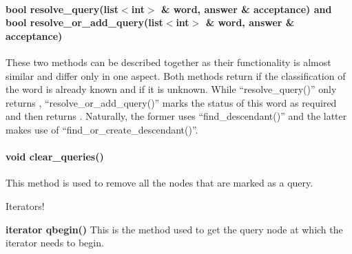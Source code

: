 \paragraph{bool resolve\_query(list$<$int$>$ \& word, answer \& acceptance) and bool resolve\_or\_add\_query(list$<$int$>$ \& word, answer & acceptance)}
	These two methods can be described together as their functionality is almost similar and differ only in one aspect. Both methods return \true if the classification of the word is already known and \false if it is unknown. While ``resolve\_query()'' only returns \false, ``resolve\_or\_add\_query()'' marks the status of this word as required and then returns \false. Naturally, the former uses ``find\_descendant()'' and the latter makes use of ``find\_or\_create\_descendant()''.

\paragraph{void clear\_queries()}
	This method is used to remove all the nodes that are marked as a query.



\vskip 1pt
\vskip 1pt

Iterators!

\textbf{iterator qbegin()}
	This is the method used to get the query node at which the iterator needs to begin. 




